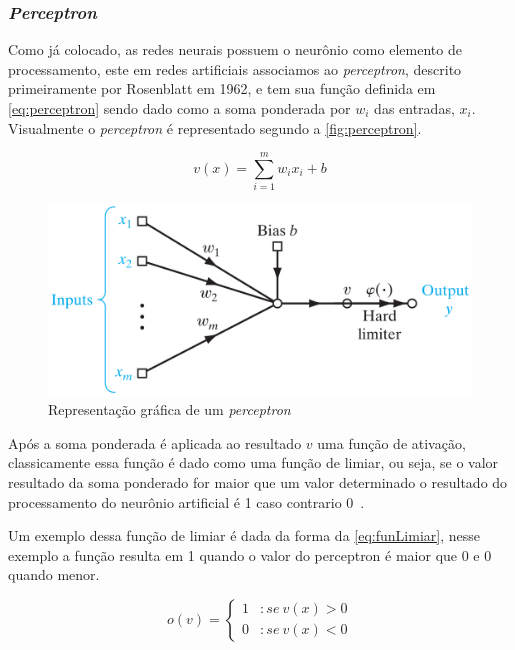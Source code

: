 \documentclass[
    12pt,
    oneside,
    a4paper,
    english,
    brazil
]{abntex2}
\begin{document}
\subsubsection{\textit{Perceptron}}

Como  já  colocado, as  redes  neurais  possuem  o  neurônio como  elemento  de
processamento,  este em  redes artificiais  associamos ao  \textit{perceptron},
descrito primeiramente  por Rosenblatt em  1962, e  tem sua função  definida em
\autoref{eq:perceptron}  sendo  dado  como  a  soma  ponderada  por  $w_i$  das
entradas,  $x_i$. Visualmente  o \textit{perceptron}  é representado  segundo a
\autoref{fig:perceptron}.

\begin{equation}\label{eq:perceptron}
    v(x) = \sum_{i=1}^{m}{w_i  x_i + b}
\end{equation}

\begin{figure}[ht]
    \centering
    \caption{Representação gráfica de um \textit{perceptron}}\label{fig:perceptron}
    \includegraphics[width=.5\linewidth]{images/perceptron.png}
\end{figure}

Após  a soma  ponderada é  aplicada ao  resultado $v$  uma função  de ativação,
classicamente essa função é dado como uma função de limiar, ou seja, se o valor
resultado da soma  ponderado for maior que um valor  determinado o resultado do
processamento do neurônio artificial é 1 caso contrario 0~\cite{knight}.

Um exemplo  dessa função de limiar  é dada da forma  da \autoref{eq:funLimiar},
nesse exemplo a função resulta em 1 quando  o valor do perceptron é maior que 0
e 0 quando menor.

\begin{equation}
    \label{eq:funLimiar}
    o(v) = \left\{
        \begin{array}{lr}
            1 & :se\  v(x) > 0\\
            0 & :se\  v(x) < 0
        \end{array}
    \right.
\end{equation}
\end{document}
